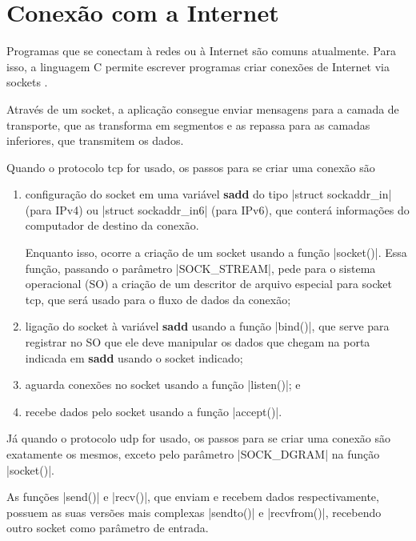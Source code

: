 
\section{Conexão com a Internet}

Programas que se conectam à redes ou à Internet são comuns atualmente. Para isso, a
linguagem C permite escrever programas criar conexões de Internet via \glspl{socket}
\cite{site:beej}.

Através de um \gls*{socket}, a aplicação consegue enviar mensagens para a camada de
transporte, que as transforma em segmentos e as repassa para as camadas inferiores, que
transmitem os dados.

Quando o protocolo \gls{tcp} for usado, os passos para se criar uma conexão são

\begin{enumerate}
    \item configuração do \gls*{socket} em uma variável \textbf{sadd} do tipo
        \sverb|struct sockaddr_in| (para IPv4) ou \sverb|struct sockaddr_in6| (para
        IPv6), que conterá informações do computador de destino da conexão.

        Enquanto isso, ocorre a criação de um \gls*{socket} usando a função
        \sverb|socket()|. Essa função, passando o parâmetro \bverb|SOCK_STREAM|, pede
        para o sistema operacional (SO) a criação de um descritor de arquivo especial
        para \gls*{socket} \gls*{tcp}, que será usado para o fluxo de dados da conexão;

    \item ligação do \gls*{socket} à variável \textbf{sadd} usando a função
        \sverb|bind()|, que serve para registrar no SO que ele deve manipular os dados
        que chegam na porta indicada em \textbf{sadd} usando o \gls*{socket} indicado;

    \item aguarda conexões no \gls*{socket} usando a função \sverb|listen()|; e

    \item recebe dados pelo \gls*{socket} usando a função \sverb|accept()|.
\end{enumerate}



Já quando o protocolo \gls{udp} for usado, os passos para se criar uma conexão são
exatamente os mesmos, exceto pelo parâmetro \bverb|SOCK_DGRAM| na função
\sverb|socket()|.


As funções \sverb|send()| e \sverb|recv()|, que enviam e recebem dados respectivamente,
possuem as suas versões mais complexas \sverb|sendto()| e \sverb|recvfrom()|, recebendo
outro \gls*{socket} como parâmetro de entrada.